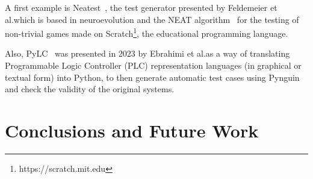\documentclass[%
  chapterprefix=false,%
  open=right,%
  twoside=true,%
  paper=a4,%
  logofile={Figures/logo.png},%
  thesistype=master,%
  UKenglish,%
]{se2thesis}
\begin{document}
A first example is Neatest~\cite{DBLP:conf/kbse/Feldmeier022}, the test generator presented by Feldemeier et al.\@ which is based in neuroevolution and the NEAT algorithm~\cite{stanley2002evolving} for the testing of non-trivial games made on Scratch\footnote{https://scratch.mit.edu}, the educational programming language.

Also, PyLC~\cite{DBLP:conf/sac/SalariEAS23} was presented in 2023 by Ebrahimi et al.\@ as a way of translating Programmable Logic Controller (PLC) representation languages (in graphical or textual form) into Python, to then generate automatic test cases using Pynguin and check the validity of the original systems.

\chapter{Conclusions and Future Work}

\backmatter{}

\printbibliography{}
\end{document}
